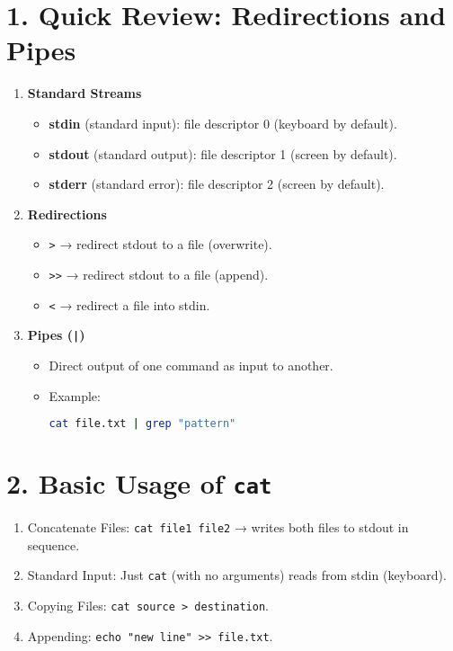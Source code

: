 \documentclass[a4paper]{report}
\begin{document}
\section*{1. Quick Review: Redirections and Pipes}
\begin{enumerate}
    \item \textbf{Standard Streams}
    \begin{itemize}
        \item \textbf{stdin} (standard input): file descriptor 0 (keyboard by default).
        \item \textbf{stdout} (standard output): file descriptor 1 (screen by default).
        \item \textbf{stderr} (standard error): file descriptor 2 (screen by default).
    \end{itemize}
    \item \textbf{Redirections}
    \begin{itemize}
        \item \texttt{>} → redirect stdout to a file (overwrite).
        \item \texttt{>>} → redirect stdout to a file (append).
        \item \texttt{<} → redirect a file into stdin.
    \end{itemize}
    \item \textbf{Pipes (\texttt{|})}
    \begin{itemize}
        \item Direct output of one command as input to another.
        \item Example:
        \begin{lstlisting}[language=bash]
cat file.txt | grep "pattern"
        \end{lstlisting}
    \end{itemize}
\end{enumerate}

\section*{2. Basic Usage of \texttt{cat}}
\begin{enumerate}
    \item Concatenate Files: \texttt{cat file1 file2} → writes both files to stdout in sequence.
    \item Standard Input: Just \texttt{cat} (with no arguments) reads from stdin (keyboard).
    \item Copying Files: \texttt{cat source > destination}.
    \item Appending: \texttt{echo "new line" >> file.txt}.
\end{enumerate}
\end{document}
